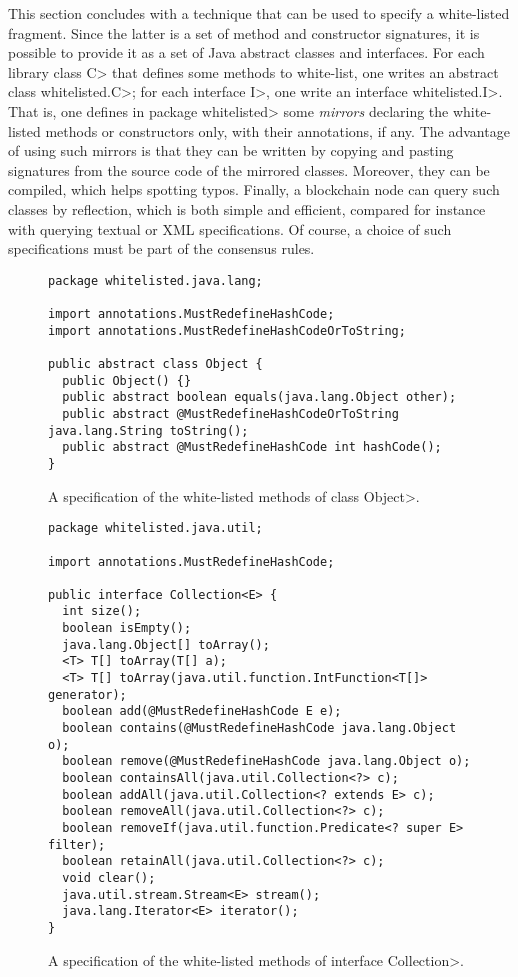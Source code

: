 This section concludes with a technique that can be used to specify a white-listed fragment.
Since the latter is a set of method and constructor signatures, it is possible to provide it
as a set of Java abstract classes and interfaces. For each library class \<C> that defines some
methods to white-list, one writes an abstract class \<whitelisted.C>;
for each interface \<I>, one write an interface \<whitelisted.I>. That is, one defines
in package \<whitelisted> some \emph{mirrors} declaring the white-listed methods or
constructors only, with their annotations, if any.
The advantage of using such mirrors is that they can be written by copying and pasting
signatures from the source code of the mirrored classes. Moreover, they can be compiled,
which helps spotting typos. Finally, a blockchain node can query such classes by reflection,
which is both simple and efficient, compared for instance with querying textual or XML
specifications. Of course, a choice of such specifications must be part of the consensus rules.

\begin{figure}[t]
\begin{verbatim}
package whitelisted.java.lang;

import annotations.MustRedefineHashCode;
import annotations.MustRedefineHashCodeOrToString;

public abstract class Object {
  public Object() {}
  public abstract boolean equals(java.lang.Object other);
  public abstract @MustRedefineHashCodeOrToString java.lang.String toString();
  public abstract @MustRedefineHashCode int hashCode();
}
\end{verbatim}
\caption{A specification of the white-listed methods of class \<Object>.}
\label{fig:white_listed_Object}
\end{figure}

\begin{figure}[t]
\begin{verbatim}
package whitelisted.java.util;

import annotations.MustRedefineHashCode;

public interface Collection<E> {
  int size();
  boolean isEmpty();
  java.lang.Object[] toArray();
  <T> T[] toArray(T[] a);
  <T> T[] toArray(java.util.function.IntFunction<T[]> generator);
  boolean add(@MustRedefineHashCode E e);
  boolean contains(@MustRedefineHashCode java.lang.Object o);
  boolean remove(@MustRedefineHashCode java.lang.Object o);
  boolean containsAll(java.util.Collection<?> c);
  boolean addAll(java.util.Collection<? extends E> c);
  boolean removeAll(java.util.Collection<?> c);
  boolean removeIf(java.util.function.Predicate<? super E> filter);
  boolean retainAll(java.util.Collection<?> c);
  void clear();
  java.util.stream.Stream<E> stream();
  java.lang.Iterator<E> iterator();
}
\end{verbatim}
\caption{A specification of the white-listed methods of interface \<Collection>.}
\label{fig:white_listed_Collection}
\end{figure}

